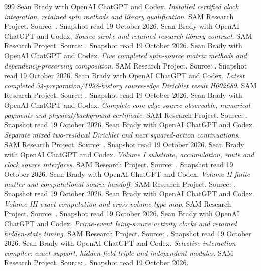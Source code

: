\begin{thebibliography}{999}
 Sean Brady with OpenAI ChatGPT and Codex. \emph{Installed certified clock integration, retained spin methods and library qualification}. SAM Research Project. Source: . Snapshot read 19 October 2026.
 Sean Brady with OpenAI ChatGPT and Codex. \emph{Source-stroke and retained research library contract}. SAM Research Project. Source: . Snapshot read 19 October 2026.
 Sean Brady with OpenAI ChatGPT and Codex. \emph{Five completed spin-source matrix methods and dependency-preserving composition}. SAM Research Project. Source: . Snapshot read 19 October 2026.
 Sean Brady with OpenAI ChatGPT and Codex. \emph{Latest completed 54-preparation/1998-history source-edge Dirichlet result H002689}. SAM Research Project. Source: . Snapshot read 19 October 2026.
 Sean Brady with OpenAI ChatGPT and Codex. \emph{Complete core-edge source observable, numerical payments and physical/background certificate}. SAM Research Project. Source: . Snapshot read 19 October 2026.
 Sean Brady with OpenAI ChatGPT and Codex. \emph{Separate mixed two-residual Dirichlet and next squared-action continuations}. SAM Research Project. Source: . Snapshot read 19 October 2026.
 Sean Brady with OpenAI ChatGPT and Codex. \emph{Volume I substrate, accumulation, route and clock source interfaces}. SAM Research Project. Source: . Snapshot read 19 October 2026.
 Sean Brady with OpenAI ChatGPT and Codex. \emph{Volume II finite matter and computational source handoff}. SAM Research Project. Source: . Snapshot read 19 October 2026.
 Sean Brady with OpenAI ChatGPT and Codex. \emph{Volume III exact computation and cross-volume type map}. SAM Research Project. Source: . Snapshot read 19 October 2026.
 Sean Brady with OpenAI ChatGPT and Codex. \emph{Prime-event Ising-source activity clocks and retained hidden-state timing}. SAM Research Project. Source: . Snapshot read 19 October 2026.
 Sean Brady with OpenAI ChatGPT and Codex. \emph{Selective interaction compiler: exact support, hidden-field triple and independent modules}. SAM Research Project. Source: . Snapshot read 19 October 2026.

\end{thebibliography}

